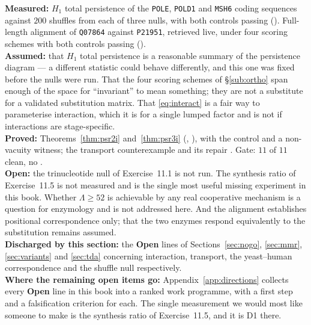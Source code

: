 \begin{ledger}
\textbf{Measured:} $H_1$ total persistence of the \texttt{POLE}, \texttt{POLD1}
and \texttt{MSH6} coding sequences against $200$ shuffles from each of three
nulls, with both controls passing
(). Full-length alignment of
\texttt{Q07864} against \texttt{P21951}, retrieved live, under four scoring
schemes with both controls passing
(). \\
\textbf{Assumed:} that $H_1$ total persistence is a reasonable summary of the
persistence diagram --- a different statistic could behave differently, and this
one was fixed before the nulls were run. That the four scoring schemes of
\S\ref{sub:ortho} span enough of the space for ``invariant'' to mean something;
they are not a substitute for a validated substitution matrix. That
\eqref{eq:interact} is a fair way to parameterise interaction, which it is for a
single lumped factor and is not if interactions are stage-specific. \\
\textbf{Proved:} Theorems~\ref{thm:psr2i} and~\ref{thm:psr3i}
(, ),
with the control  and a non-vacuity witness; the
transport counterexample  and its
repair . Gate: $11$ of $11$ clean, no
. \\
\textbf{Open:} the trinucleotide null of Exercise~11.1 is not run. The
synthesis ratio of Exercise~11.5 is not measured and is the single most useful
missing experiment in this book. Whether $\Lambda \ge 52$ is achievable by any
real cooperative mechanism is a question for enzymology and is not addressed
here. And the alignment establishes positional correspondence only; that the two
enzymes respond equivalently to the substitution remains assumed. \\
\textbf{Discharged by this section:} the \textbf{Open} lines of
Sections~\ref{sec:nogo}, \ref{sec:mmr}, \ref{sec:variants} and
\ref{sec:tda} concerning interaction, transport, the yeast--human
correspondence and the shuffle null respectively. \\
\textbf{Where the remaining open items go:}
Appendix~\ref{app:directions} collects every \textbf{Open} line in this book
into a ranked work programme, with a first step and a falsification criterion
for each. The single measurement we would most like someone to make is the
synthesis ratio of Exercise~11.5, and it is D1 there.
\end{ledger}
